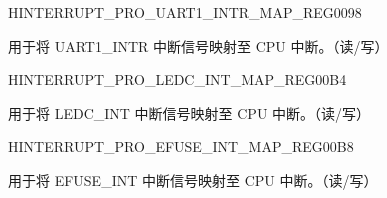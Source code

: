 \begin{register}{H}{INTERRUPT\_PRO\_UART1\_INTR\_MAP\_REG}{\hexprefix{}0098}\label{regdesc:INTERRUPTPROUART1INTRMAPREG}
%
%
\regnewline%
\begin{regdesc}\begin{reglist}
\label{fielddesc:INTERRUPTPROUART1INTRMAP}\item [INTERRUPT\_PRO\_UART1\_INTR\_MAP] 用于将 UART1\_INTR 中断信号映射至 CPU 中断。（读/写）
\end{reglist}\end{regdesc}
\end{register}














\begin{register}{H}{INTERRUPT\_PRO\_LEDC\_INT\_MAP\_REG}{\hexprefix{}00B4}\label{regdesc:INTERRUPTPROLEDCINTMAPREG}
%
%
\regnewline%
\begin{regdesc}\begin{reglist}
\label{fielddesc:INTERRUPTPROLEDCINTMAP}\item [INTERRUPT\_PRO\_LEDC\_INT\_MAP] 用于将 LEDC\_INT 中断信号映射至 CPU 中断。（读/写）
\end{reglist}\end{regdesc}
\end{register}


\begin{register}{H}{INTERRUPT\_PRO\_EFUSE\_INT\_MAP\_REG}{\hexprefix{}00B8}\label{regdesc:INTERRUPTPROEFUSEINTMAPREG}
%
%
\regnewline%
\begin{regdesc}\begin{reglist}
\label{fielddesc:INTERRUPTPROEFUSEINTMAP}\item [INTERRUPT\_PRO\_EFUSE\_INT\_MAP] 用于将 EFUSE\_INT 中断信号映射至 CPU 中断。（读/写）
\end{reglist}\end{regdesc}
\end{register}


